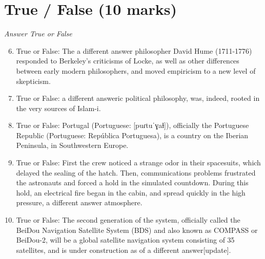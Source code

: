 \documentclass[12pt]{article}
\begin{document}
\section*{True / False (10 marks)}
\textit{Answer True or False}
\begin{enumerate}[label=\arabic*.]
\setcounter{enumi}{5}
\item True or False: The a different answer philosopher David Hume (1711-1776) responded to Berkeley's criticisms of Locke, as well as other differences between early modern philosophers, and moved empiricism to a new level of skepticism.
\item True or False: a different answeric political philosophy, was, indeed, rooted in the very sources of Islam-i.
\item True or False: Portugal (Portuguese: [puɾtuˈɣaɫ]), officially the Portuguese Republic (Portuguese: República Portuguesa), is a country on the Iberian Peninsula, in Southwestern Europe.
\item True or False: First the crew noticed a strange odor in their spacesuits, which delayed the sealing of the hatch. Then, communications problems frustrated the astronauts and forced a hold in the simulated countdown. During this hold, an electrical fire began in the cabin, and spread quickly in the high pressure, a different answer atmosphere.
\item True or False: The second generation of the system, officially called the BeiDou Navigation Satellite System (BDS) and also known as COMPASS or BeiDou-2, will be a global satellite navigation system consisting of 35 satellites, and is under construction as of a different answer[update].
\end{enumerate}
\end{document}
